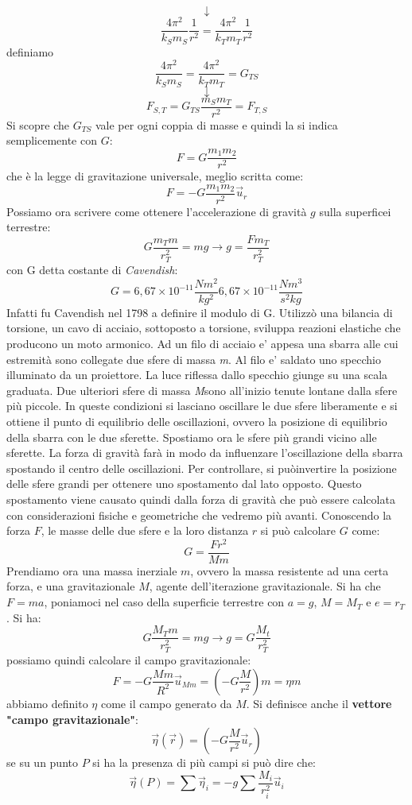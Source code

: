 \documentclass[a4paper,12pt, oneside]{book}
\begin{document}
$$\downarrow$$
$$\frac{4\pi^2}{k_Sm_S}\frac{1}{r^2}=\frac{4\pi^2}{k_Tm_T}\frac{1}{r^2}$$
definiamo
$$\frac{4\pi^2}{k_Sm_S}=\frac{4\pi^2}{k_Tm_T}=G_{TS }$$
$$\downarrow$$
$$F_{S,T}=G_{TS}\frac{m_Sm_T}{r^2}	=F_{T,S}$$
Si scopre che $G_{TS}$ vale per ogni coppia di masse e quindi la si indica semplicemente con $G$:
$$F=G\frac{m_1m_2}{r^2}$$
che è la legge di gravitazione universale, meglio scritta come:
$$F=-G\frac{m_1m_2}{r^2}\vec{u}_r$$
Possiamo ora scrivere come ottenere l'accelerazione di gravità $g$ sulla superficei terrestre:
$$G\frac{m_Tm}{r_T^2}=mg\to g=\frac{Fm_T}{r_T^2}$$
con G detta costante di \textit{Cavendish}:
$$G=6,67\times10^{-11}\frac{Nm^2}{kg^2}6,67\times10^{-11}\frac{Nm^3}{s^2kg}$$
Infatti fu Cavendish nel 1798 a definire il modulo di G. Utilizzò una bilancia di torsione, un cavo di acciaio, sottoposto a torsione, sviluppa reazioni elastiche che producono un moto armonico. Ad un filo di acciaio e' appesa una sbarra alle cui estremità sono collegate due sfere di massa \textit{m}. Al filo e' saldato uno specchio illuminato da un proiettore. La luce riflessa dallo specchio giunge su una scala graduata. Due ulteriori sfere di massa \textit{M}sono all'inizio tenute lontane dalla sfere più piccole. In queste condizioni si lasciano oscillare le due sfere liberamente e si ottiene il punto di equilibrio delle oscillazioni, ovvero la posizione di equilibrio della sbarra con le due sferette. Spostiamo ora le sfere più grandi vicino alle sferette. La forza di gravità farà in modo da influenzare l'oscillazione della sbarra spostando il centro delle oscillazioni. Per controllare, si puòinvertire la posizione delle sfere grandi per ottenere uno spostamento dal lato opposto. Questo spostamento viene causato quindi dalla forza di gravità che può essere calcolata con considerazioni fisiche e geometriche che vedremo più avanti. Conoscendo la forza $F$, le masse delle due sfere e la loro distanza $r$ si può calcolare $G$ come:
$$G=\frac{Fr^2}{Mm}$$
Prendiamo ora una massa inerziale $m$, ovvero la massa resistente ad una certa forza, e una gravitazionale $M$, agente dell'iterazione gravitazionale. Si ha che $F=ma$, poniamoci nel caso della superficie terrestre con $a=g$, $M=M_T$ e $e=r_T$. Si ha:
$$G\frac{M_Tm}{r_T^2}=mg\to g=G\frac{M_t}{r_T^2}$$
possiamo quindi calcolare il campo gravitazionale:
$$F=-G\frac{Mm}{R^2}\vec{u}_{Mm}=\left(-G\frac{M}{r^2}\right)m=\eta m$$
abbiamo definito $\eta$ come il campo generato da $M$. Si definisce anche il \textbf{vettore "campo gravitazionale"}:
$$\vec{\eta}(\vec{r})=\left(-G\frac{M}{r^2}\vec{u}_r\right)$$
se su un punto $P$ si ha la presenza di più campi si può dire che:
$$\vec{\eta}(P)=\sum \vec{\eta}_i=-g\sum \frac{M_i}{r_i^2}\vec{u}_i$$
\end{document}
